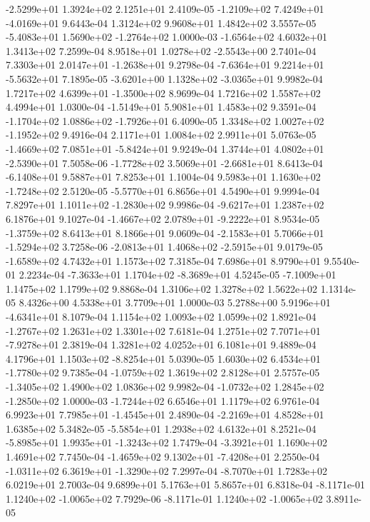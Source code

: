 -2.5299e+01  1.3924e+02  2.1251e+01  2.4109e-05
-1.2109e+02  7.4249e+01 -4.0169e+01  9.6443e-04
1.3124e+02 9.9608e+01 1.4842e+02  3.5557e-05
-5.4083e+01  1.5690e+02 -1.2764e+02  1.0000e-03
-1.6564e+02  4.6032e+01  1.3413e+02  7.2599e-04
 8.9518e+01  1.0278e+02 -2.5543e+00  2.7401e-04
 7.3303e+01  2.0147e+01 -1.2638e+01  9.2798e-04
-7.6364e+01  9.2214e+01 -5.5632e+01  7.1895e-05
-3.6201e+00  1.1328e+02 -3.0365e+01  9.9982e-04
 1.7217e+02  4.6399e+01 -1.3500e+02  8.9699e-04
1.7216e+02 1.5587e+02 4.4994e+01  1.0300e-04
-1.5149e+01  5.9081e+01  1.4583e+02  9.3591e-04
-1.1704e+02  1.0886e+02 -1.7926e+01  6.4090e-05
 1.3348e+02  1.0027e+02 -1.1952e+02  9.4916e-04
2.1171e+01 1.0084e+02 2.9911e+01  5.0763e-05
-1.4669e+02  7.0851e+01 -5.8424e+01  9.9249e-04
 1.3744e+01  4.0802e+01 -2.5390e+01  7.5058e-06
-1.7728e+02  3.5069e+01 -2.6681e+01  8.6413e-04
-6.1408e+01  9.5887e+01  7.8253e+01  1.1004e-04
 9.5983e+01  1.1630e+02 -1.7248e+02  2.5120e-05
-5.5770e+01  6.8656e+01  4.5490e+01  9.9994e-04
 7.8297e+01  1.1011e+02 -1.2830e+02  9.9986e-04
-9.6217e+01  1.2387e+02  6.1876e+01  9.1027e-04
-1.4667e+02  2.0789e+01 -9.2222e+01  8.9534e-05
-1.3759e+02  8.6413e+01  8.1866e+01  9.0609e-04
-2.1583e+01  5.7066e+01 -1.5294e+02  3.7258e-06
-2.0813e+01  1.4068e+02 -2.5915e+01  9.0179e-05
-1.6589e+02  4.7432e+01  1.1573e+02  7.3185e-04
7.6986e+01 8.9790e+01 9.5540e-01  2.2234e-04
-7.3633e+01  1.1704e+02 -8.3689e+01  4.5245e-05
-7.1009e+01  1.1475e+02  1.1799e+02  9.8868e-04
1.3106e+02 1.3278e+02 1.5622e+02  1.1314e-05
8.4326e+00 4.5338e+01 3.7709e+01  1.0000e-03
 5.2788e+00  5.9196e+01 -4.6341e+01  8.1079e-04
1.1154e+02 1.0093e+02 1.0599e+02  1.8921e-04
-1.2767e+02  1.2631e+02  1.3301e+02  7.6181e-04
 1.2751e+02  7.7071e+01 -7.9278e+01  2.3819e-04
1.3281e+02 4.0252e+01 6.1081e+01  9.4889e-04
 4.1796e+01  1.1503e+02 -8.8254e+01  5.0390e-05
 1.6030e+02  6.4534e+01 -1.7780e+02  9.7385e-04
-1.0759e+02  1.3619e+02  2.8128e+01  2.5757e-05
-1.3405e+02  1.4900e+02  1.0836e+02  9.9982e-04
-1.0732e+02  1.2845e+02 -1.2850e+02  1.0000e-03
-1.7244e+02  6.6546e+01  1.1179e+02  6.9761e-04
 6.9923e+01  7.7985e+01 -1.4545e+01  2.4890e-04
-2.2169e+01  4.8528e+01  1.6385e+02  5.3482e-05
-5.5854e+01  1.2938e+02  4.6132e+01  8.2521e-04
-5.8985e+01  1.9935e+01 -1.3243e+02  1.7479e-04
-3.3921e+01  1.1690e+02  1.4691e+02  7.7450e-04
-1.4659e+02  9.1302e+01 -7.4208e+01  2.2550e-04
-1.0311e+02  6.3619e+01 -1.3290e+02  7.2997e-04
-8.7070e+01  1.7283e+02  6.0219e+01  2.7003e-04
9.6899e+01 5.1763e+01 5.8657e+01  6.8318e-04
-8.1171e-01  1.1240e+02 -1.0065e+02  7.7929e-06
-8.1171e-01  1.1240e+02 -1.0065e+02  3.8911e-05
